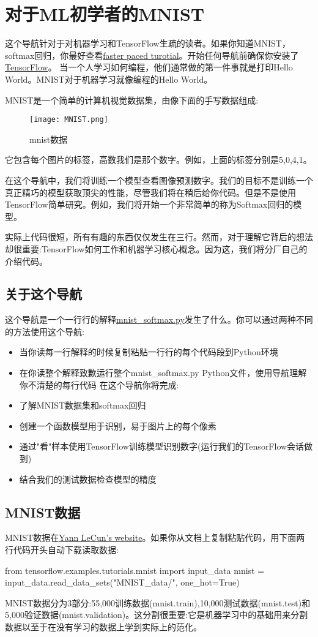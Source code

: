 \section{对于ML初学者的MNIST}
这个导航针对于对机器学习和TensorFlow生疏的读者。如果你知道MNIST，softmax回归，你最好查看\href{https://www.tensorflow.org/get_started/mnist/pros}{faster paced turotial}。开始任何导航前确保你安装了\href{https://www.tensorflow.org/install/index}{TensorFlow}。
当一个人学习如何编程，他们通常做的第一件事就是打印Hello World。MNIST对于机器学习就像编程的Hello World。

MNIST是一个简单的计算机视觉数据集，由像下面的手写数据组成:
\begin{figure}[H]
\centering
\texttt{[image: MNIST.png]}
\caption{mnist数据}
\end{figure}
它包含每个图片的标签，高数我们是那个数字。例如，上面的标签分别是5,0,4,1。

在这个导航中，我们将训练一个模型查看图像预测数字。我们的目标不是训练一个真正精巧的模型获取顶尖的性能，尽管我们将在稍后给你代码。但是不是使用TensorFlow简单研究。例如，我们将开始一个非常简单的称为Softmax回归的模型。

实际上代码很短，所有有趣的东西仅仅发生在三行。然而，对于理解它背后的想法却很重要:TensorFlow如何工作和机器学习核心概念。因为这，我们将分厂自己的介绍代码。
\subsection{关于这个导航}
这个导航是一个一行行的解释\href{https://www.github.com/tensorflow/tensorflow/blob/r1.4/tensorflow/examples/tutorials/mnist/mnist_softmax.py}{mnist\_softmax.py}发生了什么。你可以通过两种不同的方法使用这个导航:
\begin{itemize}
\item 当你读每一行解释的时候复制粘贴一行行的每个代码段到Python环境
\item 在你读整个解释致歉运行整个mnist\_softmax.py Python文件，使用导航理解你不清楚的每行代码
在这个导航你将完成:
\item 了解MNIST数据集和softmax回归
\item 创建一个函数模型用于识别，易于图片上的每个像素
\item 通过"看"样本使用TensorFlow训练模型识别数字(运行我们的TensorFlow会话做到)
\item 结合我们的测试数据检查模型的精度
\end{itemize}
\subsection{MNIST数据}
MNIST数据在\href{http://yann.lecun.com/exdb/mnist/}{Yann LeCun's website}。如果你从文档上复制粘贴代码，用下面两行代码开头自动下载读取数据:
\begin{pythoncode}
from tensorflow.examples.tutorials.mnist import input_data
mnist = input_data.read_data_sets("MNIST_data/", one_hot=True)
\end{pythoncode}
MNIST数据分为3部分:55,000训练数据(mnist.train),10,000测试数据(mnist.test)和5,000验证数据(mnist.validation)。这分割很重要:它是机器学习中的基础用来分割数据以至于在没有学习的数据上学到实际上的范化。

